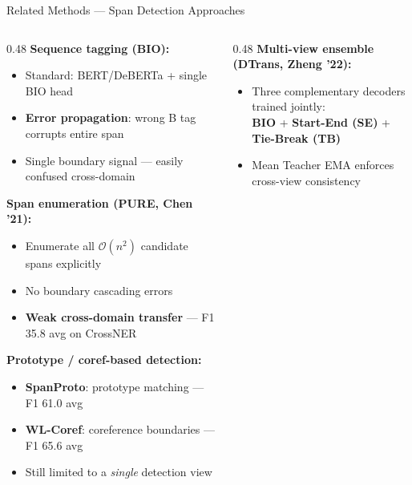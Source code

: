 \documentclass[aspectratio=169,10pt]{beamer}
\newcommand{\hr}[1]{\textcolor{dkred}{\textbf{#1}}}
\begin{document}
\begin{frame}{Related Methods — Span Detection Approaches}
  \begin{columns}[T]
    \begin{column}{0.48\textwidth}
      \textbf{Sequence tagging (BIO):}
      \begin{itemize}\setlength{\itemsep}{1pt}
        \item Standard: BERT/DeBERTa + single BIO head
        \item \hr{Error propagation}: wrong B tag corrupts entire span
        \item Single boundary signal — easily confused cross-domain
      \end{itemize}
      \vspace{0.35em}
      \textbf{Span enumeration (PURE, Chen '21):}
      \begin{itemize}\setlength{\itemsep}{1pt}
        \item Enumerate all $\mathcal{O}(n^2)$ candidate spans explicitly
        \item No boundary cascading errors
        \item \hr{Weak cross-domain transfer} — F1 35.8 avg on CrossNER
      \end{itemize}
      \vspace{0.35em}
      \textbf{Prototype / coref-based detection:}
      \begin{itemize}\setlength{\itemsep}{1pt}
        \item \textbf{SpanProto}: prototype matching — F1 61.0 avg
        \item \textbf{WL-Coref}: coreference boundaries — F1 65.6 avg
        \item Still limited to a \emph{single} detection view
      \end{itemize}
    \end{column}
    \begin{column}{0.48\textwidth}
      \textbf{Multi-view ensemble (DTrans, Zheng '22):}
      \begin{itemize}\setlength{\itemsep}{1pt}
        \item Three complementary decoders trained jointly:\\
              \quad\textbf{BIO} + \textbf{Start-End (SE)} + \textbf{Tie-Break (TB)}
        \item Mean Teacher EMA enforces cross-view consistency

\end{itemize}
\end{column}
\end{columns}
\end{frame}
\end{document}
